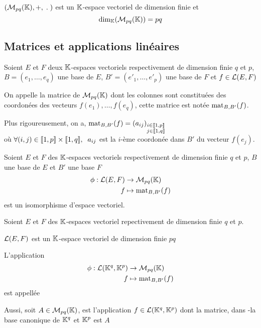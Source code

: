 \begin{prp}
$(\operatorname{\mathcal{M}}_{pq}(\mathbb{K}), +, \; \operatorname{.} \;)$ est un $\mathbb{K}$-espace vectoriel de
dimension finie et
\[
    \operatorname{dim}_{\mathbb{K}} (\operatorname{\mathcal{M}}_{pq}(\mathbb{K})) = pq
\]
\end{prp}

\subsection{Matrices et applications linéaires}

\begin{dfn}
Soient $E$ et $F$ deux $\mathbb{K}$-espaces vectoriels respectivement de
dimension finie $q$ et $p$, $B = (e_1, \ldots, e_q)$ une base de
$E$, $B' = (e'_1, \ldots, e'_p)$ une base de $F$ et $f \in \operatorname{\mathcal{L}}(E, F)$

On appelle  la matrice de
$\operatorname{\mathcal{M}}_{pq}(\mathbb{K})$ dont les colonnes sont constituées des coordonées des
vecteurs $f(e_1), \ldots, f(e_q)$, cette matrice est notée
$\operatorname{mat}_{B, B'} (f)$.

Plus rigoureusement, on a, 
$\operatorname{mat}_{B, B'}(f) = (a_{ij})_{
    \substack {i \in \llbracket 1, p \rrbracket \\ j \in \llbracket 1, q \rrbracket}}$ \\
où $\forall (i, j) \in \llbracket 1, p \rrbracket \times \llbracket 1, q \rrbracket, \;\; a_{ij} $
est la $i$-ème coordonée dans $B'$ du vecteur $f(e_j)$.
\end{dfn}

\begin{prp}
Soient $E$ et $F$ des $\mathbb{K}$-espaces vectoriels respectivement de
dimension finie $q$ et $p$, $B$ une base de $E$ et $B'$ une base $F$
\begin{align*}
    \phi : \operatorname{\mathcal{L}}(E, F)   &\to \operatorname{\mathcal{M}}_{pq}(\mathbb{K}) \\
                     f  &\mapsto \operatorname{mat}_{B, B'}(f)
\end{align*}
est un isomorphisme d'espace vectoriel.
\end{prp}

\begin{prp}
Soient $E$ et $F$ des $\mathbb{K}$-espaces vectoriel repectivement de dimension
finie $q$ et $p$.

$\operatorname{\mathcal{L}}(E, F)$ est un $\mathbb{K}$-espace vectoriel de dimension finie $pq$
\end{prp}

\begin{dfn}
L'application
\begin{align*}
    \phi:   \operatorname{\mathcal{L}}(\mathbb{K}^q, \mathbb{K}^p)    &\to        \operatorname{\mathcal{M}}_{pq}(\mathbb{K}) \\
            f                   &\mapsto    \operatorname{mat}_{B, B'}(f)
\end{align*}
est appellée 

Aussi, soit $A \in \operatorname{\mathcal{M}}_{pq}(\mathbb{K})$,  est l'application
$f \in \operatorname{\mathcal{L}}(\mathbb{K}^q, \mathbb{K}^p)$ dont la matrice, dans
\hyp{la base canonique de $\mathbb{K}^q$ et $\mathbb{K}^p$} est $A$
\end{dfn}



